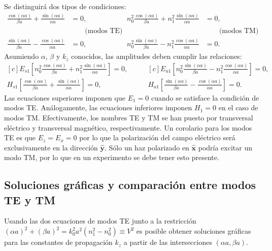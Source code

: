 Se distinguirá dos tipos de condiciones:
\begin{align*}
	\frac{\cos(\alpha a)}{\beta a} + \frac{\sin(\alpha a)}{\alpha a}&= 0, & n_0^2 \frac{\cos(\alpha a)}{\beta a} + n_1^2\frac{\sin(\alpha a)}{\alpha a}  &= 0,
	\\
	&\qquad\text{(modos TE)}	& &\qquad\text{(modos TM)}	
	\\
	 \frac{\sin(\alpha a)}{\beta a} - \frac{\cos(\alpha a)}{\alpha a} &= 0, &  n_0^2\frac{\sin(\alpha a)}{\beta a} - n_1^2\frac{\cos(\alpha a)}{\alpha a} &= 0.
\end{align*}
Asumiendo $\alpha$, $\beta$ y $k_z$ conocidos, las amplitudes deben cumplir las relaciones:
\begin{equation*}
	\begin{aligned}[c]
	E_{s1} \left[n_0^2 \frac{\cos(\alpha a)}{\beta a}+n_1 ^2 \frac{\sin(\alpha a)}{\alpha a}\right] = 0,
		\\
	H_{s1} \left[\frac{\cos(\alpha a)}{\beta a} + \frac{\sin(\alpha a)}{\alpha a} \right] = 0,
\end{aligned} 
\quad\quad
	\begin{aligned}[c]
	E_{a1} \left[ n_0^2\frac{\sin(\alpha a)}{\beta a} - n_1^2\frac{\cos(\alpha a)}{\alpha a}\right] = 0,
		\\
	H_{a1} \left[ \frac{\sin(\alpha a)}{\beta a} - \frac{\cos(\alpha a)}{\alpha a}\right] = 0.
\end{aligned} 
\end{equation*}
Las ecuaciones superiores imponen que $E_1 = 0$ cuando se satisface la condición de modos TE. Análogamente, las ecuaciones inferiores imponen $H_1 = 0$ en el caso de modos TM. Efectivamente, los nombres TE y TM se han puesto por transversal eléctrico y transversal magnético, respectivamente.
Un corolario para los modos TE es que $E_z = E_x = 0$ por lo que la polarización del campo eléctrico será exclusivamente en la dirección $\hat{\textbf{y}}$. Sólo un haz polarizado en $\hat{\textbf{x}}$ podría excitar un modo TM, por lo que en un experimento se debe tener esto presente.

\subsection{Soluciones gráficas y comparación entre modos TE y TM}

Usando las dos ecuaciones de modos TE junto a la restricción $(\alpha a)^2 + (\beta a)^2 = k_0^2 a^2(n_1^2 - n_0^2) \equiv V^2$ es posible obtener soluciones gráficas para las constantes de propagación $k_z$ a partir de las intersecciones $(\alpha a, \beta a)$. 

